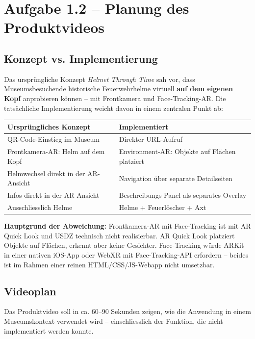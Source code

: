 \documentclass[11pt,a4paper]{article}
\begin{document}
\newpage
\section*{Aufgabe 1.2 -- Planung des Produktvideos}

\subsection*{Konzept vs. Implementierung}

Das ursprüngliche Konzept \textit{Helmet Through Time} sah vor, dass Museumsbesuchende historische Feuerwehrhelme virtuell \textbf{auf dem eigenen Kopf} anprobieren können -- mit Frontkamera und Face-Tracking-AR. Die tatsächliche Implementierung weicht davon in einem zentralen Punkt ab:

\begin{center}
\begin{tabular}{p{6.5cm} p{6.5cm}}
\toprule
\textbf{Ursprüngliches Konzept} & \textbf{Implementiert} \\
\midrule
QR-Code-Einstieg im Museum & Direkter URL-Aufruf \\
Frontkamera-AR: Helm auf dem Kopf & Environment-AR: Objekte auf Flächen platziert \\
Helmwechsel direkt in der AR-Ansicht & Navigation über separate Detailseiten \\
Infos direkt in der AR-Ansicht & Beschreibungs-Panel als separates Overlay \\
Ausschliesslich Helme & Helme + Feuerlöscher + Axt \\
\bottomrule
\end{tabular}
\end{center}

\textbf{Hauptgrund der Abweichung:} Frontkamera-AR mit Face-Tracking ist mit AR Quick Look und USDZ technisch nicht realisierbar. AR Quick Look platziert Objekte auf Flächen, erkennt aber keine Gesichter. Face-Tracking würde ARKit in einer nativen iOS-App oder WebXR mit Face-Tracking-API erfordern -- beides ist im Rahmen einer reinen HTML/CSS/JS-Webapp nicht umsetzbar.

\subsection*{Videoplan}

Das Produktvideo soll in ca. 60--90 Sekunden zeigen, wie die Anwendung in einem Museumskontext verwendet wird -- einschliesslich der Funktion, die nicht implementiert werden konnte.
\end{document}
